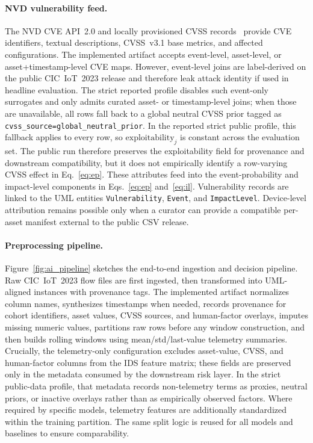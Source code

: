 \documentclass[preprint,12pt]{elsarticle}
\begin{document}
\paragraph{NVD vulnerability feed.}
The NVD CVE API~2.0 and locally provisioned CVSS records~\cite{NVD_CVE_API_2025} provide CVE identifiers, textual descriptions, CVSS~v3.1 base metrics, and affected configurations. The implemented artifact accepts event-level, asset-level, or asset+timestamp-level CVE maps. However, event-level joins are label-derived on the public CIC~IoT~2023 release and therefore leak attack identity if used in headline evaluation. The strict reported profile disables such event-only surrogates and only admits curated asset- or timestamp-level joins; when those are unavailable, all rows fall back to a global neutral CVSS prior tagged as \texttt{cvss\_source=global\_neutral\_prior}. In the reported strict public profile, this fallback applies to every row, so $\mathrm{exploitability}_j$ is constant across the evaluation set. The public run therefore preserves the exploitability field for provenance and downstream compatibility, but it does not empirically identify a row-varying CVSS effect in Eq.~\eqref{eq:ep}. These attributes feed into the event-probability and impact-level components in Eqs.~\eqref{eq:ep} and~\eqref{eq:il}. Vulnerability records are linked to the UML entities \texttt{Vulnerability}, \texttt{Event}, and \texttt{ImpactLevel}. Device-level attribution remains possible only when a curator can provide a compatible per-asset manifest external to the public CSV release.

\paragraph{Preprocessing pipeline.}
Figure~\ref{fig:ai_pipeline} sketches the end-to-end ingestion and decision pipeline. Raw CIC~IoT~2023 flow files are first ingested, then transformed into UML-aligned instances with provenance tags. The implemented artifact normalizes column names, synthesizes timestamps when needed, records provenance for cohort identifiers, asset values, CVSS sources, and human-factor overlays, imputes missing numeric values, partitions raw rows before any window construction, and then builds rolling windows using mean/std/last-value telemetry summaries. Crucially, the telemetry-only configuration excludes asset-value, CVSS, and human-factor columns from the IDS feature matrix; these fields are preserved only in the metadata consumed by the downstream risk layer. In the strict public-data profile, that metadata records non-telemetry terms as proxies, neutral priors, or inactive overlays rather than as empirically observed factors. Where required by specific models, telemetry features are additionally standardized within the training partition. The same split logic is reused for all models and baselines to ensure comparability.
\end{document}
